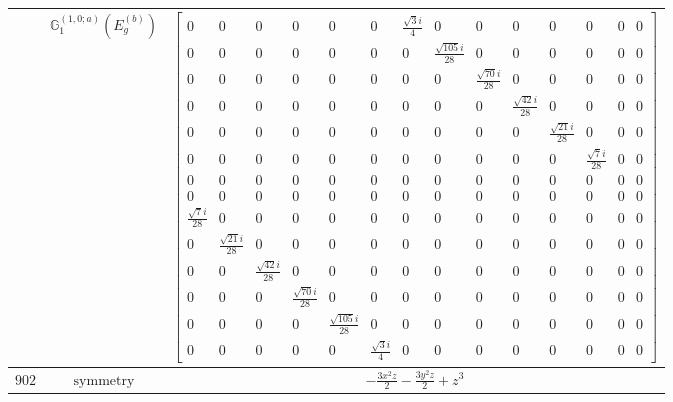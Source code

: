 \documentclass[fleqn,8pt,landscape]{jsarticle}
\begin{document}
\begin{longtable}{ccc}
$  $ & $ \mathbb{G}_{1}^{(1,0;a)}(E_{g}^{(b)}) $ & $ \begin{bmatrix} 0 & 0 & 0 & 0 & 0 & 0 & \frac{\sqrt{3} i}{4} & 0 & 0 & 0 & 0 & 0 & 0 & 0 \\ 0 & 0 & 0 & 0 & 0 & 0 & 0 & \frac{\sqrt{105} i}{28} & 0 & 0 & 0 & 0 & 0 & 0 \\ 0 & 0 & 0 & 0 & 0 & 0 & 0 & 0 & \frac{\sqrt{70} i}{28} & 0 & 0 & 0 & 0 & 0 \\ 0 & 0 & 0 & 0 & 0 & 0 & 0 & 0 & 0 & \frac{\sqrt{42} i}{28} & 0 & 0 & 0 & 0 \\ 0 & 0 & 0 & 0 & 0 & 0 & 0 & 0 & 0 & 0 & \frac{\sqrt{21} i}{28} & 0 & 0 & 0 \\ 0 & 0 & 0 & 0 & 0 & 0 & 0 & 0 & 0 & 0 & 0 & \frac{\sqrt{7} i}{28} & 0 & 0 \\ 0 & 0 & 0 & 0 & 0 & 0 & 0 & 0 & 0 & 0 & 0 & 0 & 0 & 0 \\ 0 & 0 & 0 & 0 & 0 & 0 & 0 & 0 & 0 & 0 & 0 & 0 & 0 & 0 \\ \frac{\sqrt{7} i}{28} & 0 & 0 & 0 & 0 & 0 & 0 & 0 & 0 & 0 & 0 & 0 & 0 & 0 \\ 0 & \frac{\sqrt{21} i}{28} & 0 & 0 & 0 & 0 & 0 & 0 & 0 & 0 & 0 & 0 & 0 & 0 \\ 0 & 0 & \frac{\sqrt{42} i}{28} & 0 & 0 & 0 & 0 & 0 & 0 & 0 & 0 & 0 & 0 & 0 \\ 0 & 0 & 0 & \frac{\sqrt{70} i}{28} & 0 & 0 & 0 & 0 & 0 & 0 & 0 & 0 & 0 & 0 \\ 0 & 0 & 0 & 0 & \frac{\sqrt{105} i}{28} & 0 & 0 & 0 & 0 & 0 & 0 & 0 & 0 & 0 \\ 0 & 0 & 0 & 0 & 0 & \frac{\sqrt{3} i}{4} & 0 & 0 & 0 & 0 & 0 & 0 & 0 & 0 \end{bmatrix} $ \\ \hline
$ 902 $ & $ \text{symmetry} $ & $ - \frac{3 x^{2} z}{2} - \frac{3 y^{2} z}{2} + z^{3} $ \\

\end{longtable}
\end{document}
